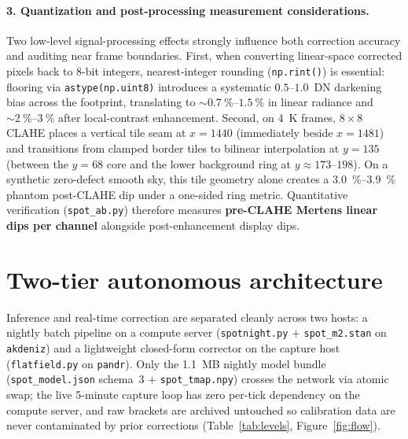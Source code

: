 \documentclass[11pt,a4paper]{article}
\newcommand{\code}[1]{\texttt{\small #1}}
\begin{document}
\paragraph{3. Quantization and post-processing measurement considerations.}
Two low-level signal-processing effects strongly influence both correction accuracy and
auditing near frame boundaries. First, when converting linear-space corrected pixels
back to 8-bit integers, nearest-integer rounding (\code{np.rint()}) is essential:
flooring via \code{astype(np.uint8)} introduces a systematic $0.5$--$1.0$~DN darkening
bias across the footprint, translating to $\sim\SIrange{0.7}{1.5}{\percent}$ in linear
radiance and $\sim\SIrange{2}{3}{\percent}$ after local-contrast enhancement. Second,
on \SI{4}{K} frames, $8\times 8$ CLAHE places a vertical tile seam at $x = 1440$
(immediately beside $x = 1481$) and transitions from clamped border tiles to bilinear
interpolation at $y = 135$ (between the $y = 68$ core and the lower background ring at
$y \approx 173$--$198$). On a synthetic zero-defect smooth sky, this tile geometry alone
creates a \SIrange{+3.0}{+3.9}{\percent} phantom post-CLAHE dip under a one-sided
ring metric. Quantitative verification (\code{spot\_ab.py}) therefore measures
\textbf{pre-CLAHE Mertens linear dips per channel} alongside post-enhancement display
dips.

\section{Two-tier autonomous architecture}
\label{sec:architecture}

Inference and real-time correction are separated cleanly across two hosts: a nightly
batch pipeline on a compute server (\code{spotnight.py} + \code{spot\_m2.stan} on
\code{akdeniz}) and a lightweight closed-form corrector on the capture host
(\code{flatfield.py} on \code{pandr}). Only the \SI{1.1}{MB} nightly model bundle
(\code{spot\_model.json} schema~3 + \code{spot\_tmap.npy}) crosses the network via
atomic swap; the live 5-minute capture loop has zero per-tick dependency on the compute
server, and raw brackets are archived untouched so calibration data are never
contaminated by prior corrections (Table~\ref{tab:levels}, Figure~\ref{fig:flow}).
\end{document}
